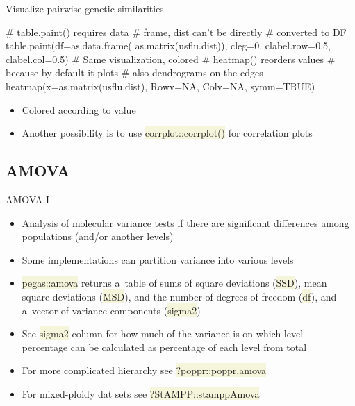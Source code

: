 \documentclass[compress, ucs, xelatex, 11pt, xcolor=svgnames, aspectratio=169,
	hyperref={
		bookmarks=true,
		unicode=true,
		colorlinks=true,
		pdftitle={Molecular data in R},
		plainpages=false,
		pdfauthor={Vojtech Zeisek},
		pdfsubject={Course about phylogeny and evolution in R},
		pdfcreator={XeLaTeX},
		pdfkeywords={R, evolution, phylogeny, molecular data},
		linkcolor=Crimson, %
		anchorcolor=Magenta, %
		citecolor=Magenta, %
		filecolor=Magenta, %
		menucolor=Magenta, %
		urlcolor=DodgerBlue, %
		pdftex},
	url={hyphens, lowtilde} %
	]{beamer}
\renewcommand{\texttt}[1]{\colorbox{Beige}{{\ttfamily #1}}}
\begin{document}
\begin{frame}[fragile]{Visualize pairwise genetic similarities}
	\begin{multicols}{2}
		\vfil
		\begin{spluscode}
    # table.paint() requires data
    # frame, dist can't be directly
    # converted to DF
    table.paint(df=as.data.frame(
      as.matrix(usflu.dist)), cleg=0,
      clabel.row=0.5, clabel.col=0.5)
    # Same visualization, colored
    # heatmap() reorders values
    # because by default it plots
    # also dendrograms on the edges
    heatmap(x=as.matrix(usflu.dist),
      Rowv=NA, Colv=NA, symm=TRUE)
		\end{spluscode}
		\vfill
		\begin{itemize}
			\item Colored according to value
			\item Another possibility is to use \texttt{corrplot::corrplot()} for correlation plots
		\end{itemize}
		\columnbreak
		\begin{center}
			\texttt{[image: dna-dists.png]}
		\end{center}
	\end{multicols}
\end{frame}

\subsection{AMOVA} %

\begin{frame}{AMOVA I}
	\begin{itemize}
		\item Analysis of molecular variance tests if there are significant differences among populations (and/or another levels)
		\item Some implementations can partition variance into various levels
		\item \texttt{pegas::amova} returns a~table of sums of square deviations (\texttt{SSD}), mean square deviations (\texttt{MSD}), and the number of degrees of freedom (\texttt{df}), and a~vector of variance components (\texttt{sigma2})
		\item See \texttt{sigma2} column for how much of the variance is on which level --- percentage can be calculated as percentage of each level from total
		\item For more complicated hierarchy see \texttt{?poppr::poppr.amova}
		\item For mixed-ploidy dat sets see \texttt{?StAMPP::stamppAmova}
	\end{itemize}
\end{frame}
\end{document}
